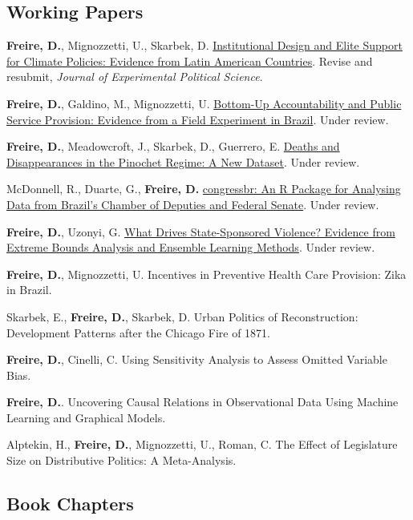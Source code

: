 \documentclass[a4paper]{article}
\renewenvironment{itemize}{
	\begin{list}{}{
			\setlength{\leftmargin}{1.5em}
		}
		}{
	\end{list}
}
\begin{document}
	\subsection*{Working Papers}

	\begin{itemize}
		\item \textbf{Freire, D.}, Mignozzetti, U., Skarbek, D. \href{https://doi.org/10.31235/osf.io/9a6ch}{Institutional Design and Elite Support for Climate Policies: Evidence from Latin American Countries}. Revise and resubmit, \textit{Journal of Experimental Political Science}.
		\item \textbf{Freire, D.}, Galdino, M., Mignozzetti, U. \href{https://osf.io/preprints/socarxiv/keznu}{Bottom-Up Accountability and Public Service Provision: Evidence from a Field Experiment in Brazil}. Under review.
		\item \textbf{Freire, D.}, Meadowcroft, J., Skarbek, D., Guerrero, E. \href{https://osf.io/vqnwu}{Deaths and Disappearances in the Pinochet Regime: A New Dataset}. Under review. 
		\item McDonnell, R., Duarte, G., \textbf{Freire, D.} \href{https://osf.io/n5jd8}{congressbr: An R Package for Analysing Data from Brazil's Chamber of Deputies and Federal Senate}. Under review.
		\item \textbf{Freire, D.}, Uzonyi, G. \href{https://osf.io/pzx3q}{What Drives State-Sponsored Violence? Evidence from Extreme Bounds Analysis and Ensemble Learning Methods}. Under review.
		\item \textbf{Freire, D.}, Mignozzetti, U. Incentives in Preventive Health Care Provision: Zika in Brazil. 
		\item Skarbek, E., \textbf{Freire, D.}, Skarbek, D. Urban Politics of Reconstruction: Development Patterns after the Chicago Fire of 1871.
		\item \textbf{Freire, D.}, Cinelli, C. Using Sensitivity Analysis to Assess Omitted Variable Bias.
		\item \textbf{Freire, D.}. Uncovering Causal Relations in Observational Data Using Machine Learning and Graphical Models.
		\item Alptekin, H., \textbf{Freire, D.}, Mignozzetti, U., Roman, C. The Effect of Legislature Size on Distributive Politics: A Meta-Analysis.
	\end{itemize}

	\subsection*{Book Chapters}
\end{document}
